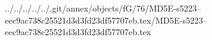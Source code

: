 ../../../../../.git/annex/objects/fG/76/MD5E-s5223--eec9ac738c25521d3d3fd23df57707eb.tex/MD5E-s5223--eec9ac738c25521d3d3fd23df57707eb.tex